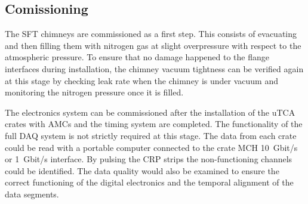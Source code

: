 

\subsection{Comissioning}
\label{sec:fddp-tpc-elec-comission}

The SFT chimneys are commissioned as a first step. This consists of evacuating and then filling them with nitrogen gas at slight overpressure with respect to the atmospheric pressure. To ensure that no damage happened to the flange interfaces during installation, the chimney vacuum tightness can be verified again at this stage by checking leak rate when the chimney is under vacuum and monitoring the nitrogen pressure once it is filled.

The electronics system can be commissioned after the installation of the uTCA crates with AMCs and the timing system are completed. The functionality of the full DAQ system is not strictly required at this stage. The data from each crate could be read with a portable computer connected to the crate MCH \SI{10}{Gbit/s} or \SI{1}{Gbit/s} interface. By pulsing the CRP strips the non-functioning channels could be identified. The data quality would also be examined to ensure the correct functioning of the digital electronics and the temporal alignment of the data segments.   




